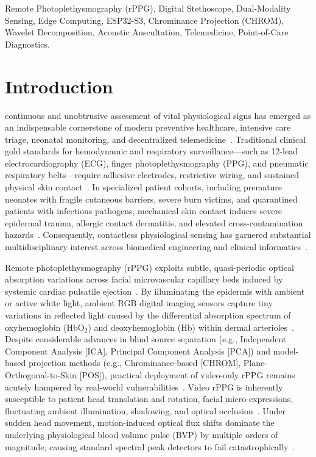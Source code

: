 \documentclass[journal]{IEEEtran}
\begin{document}
\begin{IEEEkeywords}
Remote Photoplethysmography (rPPG), Digital Stethoscope, Dual-Modality Sensing, Edge Computing, ESP32-S3, Chrominance Projection (CHROM), Wavelet Decomposition, Acoustic Auscultation, Telemedicine, Point-of-Care Diagnostics.
\end{IEEEkeywords}

\section{Introduction}

 continuous and unobtrusive assessment of vital physiological signs has emerged as an indispensable cornerstone of modern preventive healthcare, intensive care triage, neonatal monitoring, and decentralized telemedicine~\cite{ref1}. Traditional clinical gold standards for hemodynamic and respiratory surveillance---such as 12-lead electrocardiography (ECG), finger photoplethysmography (PPG), and pneumatic respiratory belts---require adhesive electrodes, restrictive wiring, and sustained physical skin contact~\cite{ref2}. In specialized patient cohorts, including premature neonates with fragile cutaneous barriers, severe burn victims, and quarantined patients with infectious pathogens, mechanical skin contact induces severe epidermal trauma, allergic contact dermatitis, and elevated cross-contamination hazards~\cite{ref3}. Consequently, contactless physiological sensing has garnered substantial multidisciplinary interest across biomedical engineering and clinical informatics~\cite{ref4}.

Remote photoplethysmography (rPPG) exploits subtle, quasi-periodic optical absorption variations across facial microvascular capillary beds induced by systemic cardiac pulsatile ejection~\cite{ref5}. By illuminating the epidermis with ambient or active white light, ambient RGB digital imaging sensors capture tiny variations in reflected light caused by the differential absorption spectrum of oxyhemoglobin ($\mathrm{HbO_2}$) and deoxyhemoglobin ($\mathrm{Hb}$) within dermal arterioles~\cite{ref6}. Despite considerable advances in blind source separation (e.g., Independent Component Analysis [ICA], Principal Component Analysis [PCA]) and model-based projection methods (e.g., Chrominance-based [CHROM], Plane-Orthogonal-to-Skin [POS]), practical deployment of video-only rPPG remains acutely hampered by real-world vulnerabilities~\cite{ref7}. Video rPPG is inherently susceptible to patient head translation and rotation, facial micro-expressions, fluctuating ambient illumination, shadowing, and optical occlusion~\cite{ref8}. Under sudden head movement, motion-induced optical flux shifts dominate the underlying physiological blood volume pulse (BVP) by multiple orders of magnitude, causing standard spectral peak detectors to fail catastrophically~\cite{ref9}.
\end{document}
